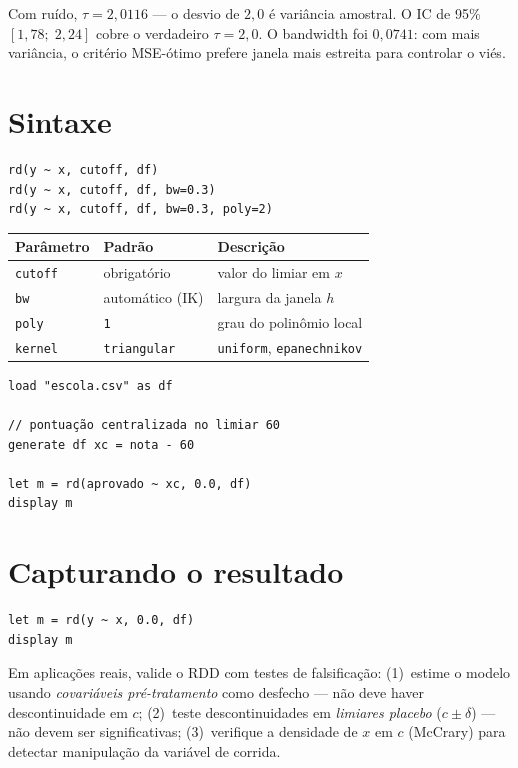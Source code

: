 Com ruído, $\hat\tau = 2{,}0116$ — o desvio de $2{,}0$ é variância amostral.
O IC de 95\% $[1{,}78;\; 2{,}24]$ cobre o verdadeiro $\tau = 2{,}0$.
O bandwidth foi $0{,}0741$: com mais variância, o critério MSE-ótimo
prefere janela mais estreita para controlar o viés.

\section{Sintaxe}

\begin{lstlisting}
rd(y ~ x, cutoff, df)
rd(y ~ x, cutoff, df, bw=0.3)
rd(y ~ x, cutoff, df, bw=0.3, poly=2)
\end{lstlisting}

\begin{center}
\begin{tabular}{lll}
\toprule
\textbf{Parâmetro} & \textbf{Padrão} & \textbf{Descrição} \\
\midrule
\texttt{cutoff}  & obrigatório & valor do limiar em $x$ \\
\texttt{bw}      & automático (IK) & largura da janela $h$ \\
\texttt{poly}    & \texttt{1} & grau do polinômio local \\
\texttt{kernel}  & \texttt{triangular} & \texttt{uniform}, \texttt{epanechnikov} \\
\bottomrule
\end{tabular}
\end{center}

\begin{lstlisting}[caption={Fluxo típico — nota de corte e bolsa}]
load "escola.csv" as df

// pontuação centralizada no limiar 60
generate df xc = nota - 60

let m = rd(aprovado ~ xc, 0.0, df)
display m
\end{lstlisting}

\section{Capturando o resultado}

\begin{lstlisting}
let m = rd(y ~ x, 0.0, df)
display m
\end{lstlisting}

\begin{nota}
  Em aplicações reais, valide o RDD com testes de falsificação:
  (1)~estime o modelo usando \emph{covariáveis pré-tratamento} como
  desfecho — não deve haver descontinuidade em $c$;
  (2)~teste descontinuidades em \emph{limiares placebo} ($c \pm \delta$)
  — não devem ser significativas; (3)~verifique a densidade de $x$ em
  $c$ (McCrary) para detectar manipulação da variável de corrida.
\end{nota}

